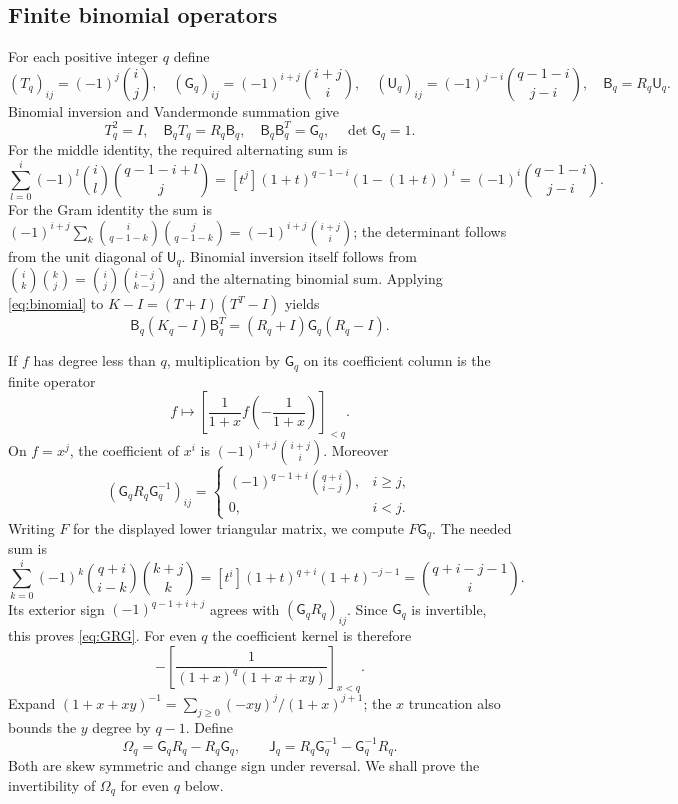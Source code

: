 \documentclass[11pt,a4paper]{amsart}
\theoremstyle{remark}\newtheorem{remark}[theorem]{Remark}
\numberwithin{equation}{section}
\newcommand{\G}{\mathsf G}
\newcommand{\U}{\mathsf U}
\newcommand{\B}{\mathsf B}
\newcommand{\J}{\mathsf J}
\begin{document}
\subsection{Finite binomial operators}
For each positive integer $q$ define
\[
 (T_q)_{ij}=(-1)^j\binom ij,\quad
 (\G_q)_{ij}=(-1)^{i+j}\binom{i+j}{i},\quad
 (\U_q)_{ij}=(-1)^{j-i}\binom{q-1-i}{j-i},\quad \B_q=R_q\U_q.
\]
Binomial inversion and Vandermonde summation give
\begin{equation}\label{eq:binomial}
 T_q^2=I,\quad \B_qT_q=R_q\B_q,\quad
 \B_q\B_q^T=\G_q,\quad \det\G_q=1.
\end{equation}
For the middle identity, the required alternating sum is
\[
 \sum_{l=0}^i(-1)^l\binom il\binom{q-1-i+l}{j}
 =[t^j](1+t)^{q-1-i}(1-(1+t))^i
 =(-1)^i\binom{q-1-i}{j-i}.
\]
For the Gram identity the sum is
$(-1)^{i+j}\sum_k\binom i{q-1-k}\binom j{q-1-k}
=(-1)^{i+j}\binom{i+j}i$; the determinant follows from the unit diagonal of $\U_q$. Binomial inversion itself follows from
$\binom ik\binom kj=\binom ij\binom{i-j}{k-j}$ and the alternating binomial sum. Applying \eqref{eq:binomial} to $K-I=(T+I)(T^T-I)$ yields
\begin{equation}\label{eq:K-congruence}
 \B_q(K_q-I)\B_q^T=(R_q+I)\G_q(R_q-I).
\end{equation}

If $f$ has degree less than $q$, multiplication by $\G_q$ on its coefficient column is the finite operator
\begin{equation}\label{eq:G-action}
 f\longmapsto\left[\frac1{1+x}f\left(-\frac1{1+x}\right)\right]_{<q}.
\end{equation}
On $f=x^j$, the coefficient of $x^i$ is $(-1)^{i+j}\binom{i+j}i$. Moreover
\begin{equation}\label{eq:GRG}
 (\G_qR_q\G_q^{-1})_{ij}=
 \begin{cases}(-1)^{q-1+i}\binom{q+i}{i-j},&i\ge j,\\0,&i<j.\end{cases}
\end{equation}
Writing $F$ for the displayed lower triangular matrix, we compute $F\G_q$. The needed sum is
\[
 \sum_{k=0}^i(-1)^k\binom{q+i}{i-k}\binom{k+j}k
 =[t^i](1+t)^{q+i}(1+t)^{-j-1}
 =\binom{q+i-j-1}i.
\]
Its exterior sign $(-1)^{q-1+i+j}$ agrees with $(\G_qR_q)_{ij}$. Since $\G_q$ is invertible, this proves \eqref{eq:GRG}. For even $q$ the coefficient kernel is therefore
\begin{equation}\label{eq:rational-trunc}
 -\left[\frac1{(1+x)^q(1+x+xy)}\right]_{x<q}.
\end{equation}
Expand $(1+x+xy)^{-1}=\sum_{j\ge0}(-xy)^j/(1+x)^{j+1}$; the $x$ truncation also bounds the $y$ degree by $q-1$.
Define
\begin{equation}\label{eq:omega}
 \Omega_q=\G_qR_q-R_q\G_q,\qquad
 \J_q=R_q\G_q^{-1}-\G_q^{-1}R_q.
\end{equation}
Both are skew symmetric and change sign under reversal. We shall prove the invertibility of $\Omega_q$ for even $q$ below.
\end{document}
